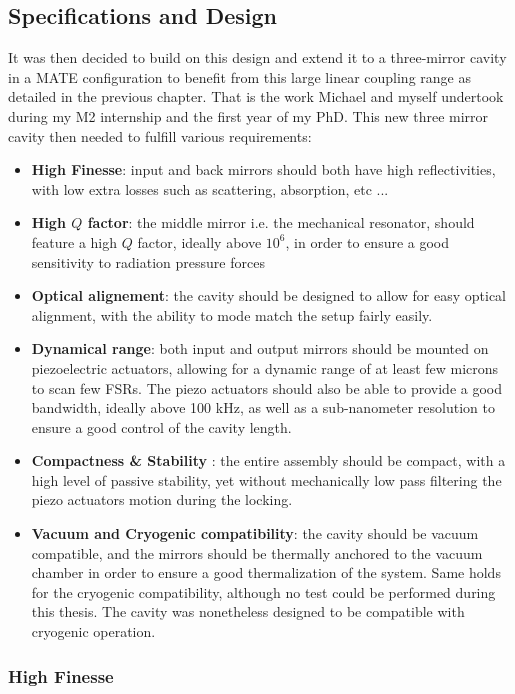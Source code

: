 \subsection{Specifications and Design}
It was then decided to build on this design and extend it to a three-mirror cavity in a MATE configuration to benefit from this large linear coupling range as detailed in the previous chapter. That is the work Michael and myself undertook during my M2 internship and the first year of my PhD.
This new three mirror cavity then needed to fulfill various requirements: 
\begin{itemize}
    \item \textbf{High Finesse}: input and back mirrors should both have high reflectivities, with low extra losses such as scattering, absorption, etc ...\cite{AmatoPhD}
    \item \textbf{High $Q$ factor}: the middle mirror i.e. the mechanical resonator, should feature a high $Q$ factor, ideally above $10^6$, in order to ensure a good sensitivity to radiation pressure forces\cite{SiN_review}
    \item \textbf{Optical alignement}: the cavity should be designed to allow for easy optical alignment, with the ability to mode match the setup fairly easily.
    \item \textbf{Dynamical range}: both input and output mirrors should be mounted on piezoelectric actuators, allowing for a dynamic range of at least few microns to scan few FSRs. The piezo actuators should also be able to provide a good bandwidth, ideally above 100 kHz, as well as a sub-nanometer resolution to ensure a good control of the cavity length\cite{piezo_review}.
    \item \textbf{Compactness \& Stability }: the entire assembly should be compact, with a high level of passive stability, yet without mechanically low pass filtering the piezo actuators motion during the locking. 
    \item \textbf{Vacuum and Cryogenic compatibility}: the cavity should be vacuum compatible, and the mirrors should be thermally anchored to the vacuum chamber in order to ensure a good thermalization of the system. Same holds for the cryogenic compatibility, although no test could be performed during this thesis. The cavity was nonetheless designed to be compatible with cryogenic operation.
\end{itemize}
\subsubsection{High Finesse}

